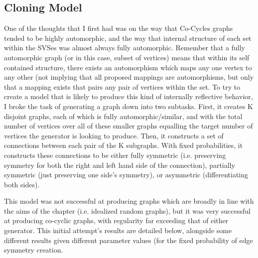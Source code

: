 \subsection{Cloning Model}
One of the thoughts that I first had was on the way that Co-Cycles graphs tended to be highly automorphic, and the way that internal structure of each set within the SVSes was almost always fully automorphic.
Remember that a fully automorphic graph (or in this case, subset of vertices) means that within its self contained structure, there exists an automorphism which maps any one vertex to any other (not implying that all proposed mappings are automorphisms, but only that a mapping exists that pairs any pair of vertices within the set.
To try to create a model that is likely to produce this kind of internally reflective behavior, I broke the task of generating a graph down into two subtasks.
First, it creates K disjoint graphs, each of which is fully automorphic/similar, and with the total number of vertices over all of these smaller graphs equalling the target number of vertices the generator is looking to produce.
Then, it constructs a set of connections between each pair of the K subgraphs.
With fixed probabilities, it constructs these connections to be either fully symmetric (i.e. preserving symmetry for both the right and left hand side of the connection), partially symmetric (just preserving one side's symmetry), or asymmetric (differentiating both sides).

This model was not successful at producing graphs which are broadly in line with the aims of the chapter (i.e. idealized random graphs), but it was very successful at producing co-cyclic graphs, with regularity far exceeding that of either generator. This initial attempt's results are detailed below, alongside some different results given different parameter values (for the fixed probability of edge symmetry creation.
